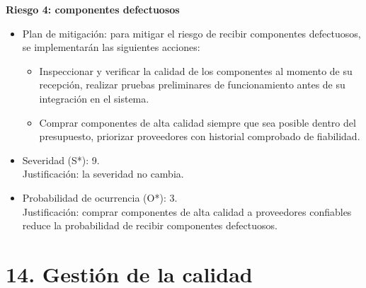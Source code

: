 \documentclass[
11pt, %
]{charter}
\begin{document}
\textbf{Riesgo 4: componentes defectuosos}
\begin{itemize}
	\item Plan de mitigación: para mitigar el riesgo de recibir componentes defectuosos, se implementarán las siguientes acciones:
	\begin{itemize}
		\item Inspeccionar y verificar la calidad de los componentes al momento de su recepción, realizar pruebas preliminares de funcionamiento antes de su integración en el sistema.
		\item Comprar componentes de alta calidad siempre que sea posible dentro del presupuesto, priorizar proveedores con historial comprobado de fiabilidad.
	\end{itemize}
    \item Severidad (S*): 9.\\
    Justificación: la severidad no cambia.
    \item Probabilidad de ocurrencia (O*): 3.\\
    Justificación: comprar componentes de alta calidad a proveedores confiables reduce la probabilidad de recibir componentes defectuosos.
\end{itemize}



\section{14. Gestión de la calidad}
\label{sec:calidad}



\end{document}
